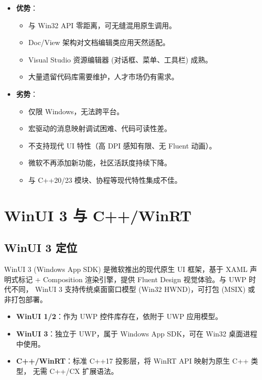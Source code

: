\documentclass[12pt,a4paper,fontset=fandol]{ctexbook}
\begin{document}
\begin{compare}[title=MFC 优劣分析]
\begin{itemize}
  \item \textbf{优势}：
    \begin{itemize}
      \item 与 Win32 API 零距离，可无缝混用原生调用。
      \item Doc/View 架构对文档编辑类应用天然适配。
      \item Visual Studio 资源编辑器 (对话框、菜单、工具栏) 成熟。
      \item 大量遗留代码库需要维护，人才市场仍有需求。
    \end{itemize}
  \item \textbf{劣势}：
    \begin{itemize}
      \item 仅限 Windows，无法跨平台。
      \item 宏驱动的消息映射调试困难、代码可读性差。
      \item 不支持现代 UI 特性（高 DPI 感知有限、无 Fluent 动画）。
      \item 微软不再添加新功能，社区活跃度持续下降。
      \item 与 C++20/23 模块、协程等现代特性集成不佳。
    \end{itemize}
\end{itemize}
\end{compare}

\chapter{WinUI 3 与 C++/WinRT}

\section{WinUI 3 定位}

WinUI 3 (Windows App SDK) 是微软推出的现代原生 UI 框架，基于 XAML 声明式标记 +
Composition 渲染引擎，提供 Fluent Design 视觉体验。与 UWP 时代不同，
WinUI 3 支持传统桌面窗口模型 (Win32 HWND)，可打包 (MSIX) 或非打包部署。

\begin{itemize}
  \item \textbf{WinUI 1/2}：作为 UWP 控件库存在，依附于 UWP 应用模型。
  \item \textbf{WinUI 3}：独立于 UWP，属于 Windows App SDK，可在 Win32 桌面进程中使用。
  \item \textbf{C++/WinRT}：标准 C++17 投影层，将 WinRT API 映射为原生 C++ 类型，
        无需 C++/CX 扩展语法。
\end{itemize}
\end{document}

